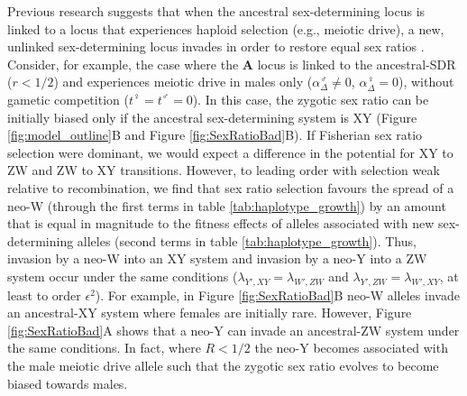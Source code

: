 \documentclass[12pt]{article}
\begin{document}
Previous research suggests that when the ancestral sex-determining locus is linked to a locus that experiences haploid selection (e.g., meiotic drive), a new, unlinked sex-determining locus invades in order to restore equal sex ratios \citep{Kozielska:2010vm}. 
Consider, for example, the case where the \textbf{A} locus is linked to the ancestral-SDR ($r<1/2$) and experiences meiotic drive in males only ($\alpha^\male_\Delta \neq 0$, $\alpha^\female_\Delta=0$), without gametic competition ($t^\female=t^\male=0$).
In this case, the zygotic sex ratio can be initially biased only if the ancestral sex-determining system is XY (Figure \ref{fig:model_outline}B and Figure \ref{fig:SexRatioBad}B). 
If Fisherian sex ratio selection were dominant, we would expect a difference in the potential for XY to ZW and ZW to XY transitions. 
However, to leading order with selection weak relative to recombination, we find that sex ratio selection favours the spread of a neo-W (through the first terms in table \ref{tab:haplotype_growth}) by an amount that is equal in magnitude to the fitness effects of alleles associated with new sex-determining alleles (second terms in table \ref{tab:haplotype_growth}).
Thus, invasion by a neo-W into an XY system and invasion by a neo-Y into a ZW system occur under the same conditions ($\lambda_{Y',XY}=\lambda_{W',ZW}$ and $\lambda_{Y',ZW}=\lambda_{W',XY}$, at least to order $\epsilon^2$).
For example, in Figure \ref{fig:SexRatioBad}B neo-W alleles invade an ancestral-XY system where females are initially rare.
However, Figure \ref{fig:SexRatioBad}A shows that a neo-Y can invade an ancestral-ZW system under the same conditions. 
In fact, where $R<1/2$ the neo-Y becomes associated with the male meiotic drive allele such that the zygotic sex ratio evolves to become biased towards males.

\end{document}

